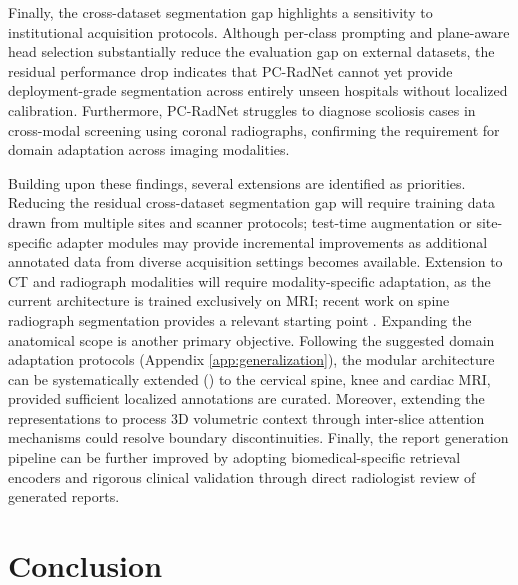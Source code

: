 \documentclass[journal]{IEEEtran}
\newcommand{\modelname}{PC-RadNet}
\begin{document}
Finally, the cross-dataset segmentation gap highlights a sensitivity to institutional acquisition protocols. Although per-class prompting and plane-aware head selection substantially reduce the evaluation gap on external datasets, the residual performance drop indicates that \modelname{} cannot yet provide deployment-grade segmentation across entirely unseen hospitals without localized calibration. Furthermore, \modelname{} struggles to diagnose scoliosis cases in cross-modal screening using coronal radiographs, confirming the requirement for domain adaptation across imaging modalities. 


Building upon these findings, several extensions are identified as priorities. Reducing the residual cross-dataset segmentation gap will require training data drawn from multiple sites and scanner protocols; test-time augmentation or site-specific adapter modules may provide incremental improvements as additional annotated data from diverse acquisition settings becomes available. Extension to CT and radiograph modalities will require modality-specific adaptation, as the current architecture is trained exclusively on MRI; recent work on spine radiograph segmentation provides a relevant starting point \cite{spinefm2025}. Expanding the anatomical scope is another primary objective. Following the suggested domain adaptation protocols (Appendix \ref{app:generalization}), the modular architecture can be systematically extended () to the cervical spine, knee and cardiac MRI, provided sufficient localized annotations are curated. Moreover, extending the representations to process 3D volumetric context through inter-slice attention mechanisms could resolve boundary discontinuities. Finally, the report generation pipeline can be further improved by adopting biomedical-specific retrieval encoders and rigorous clinical validation through direct radiologist review of generated reports. 

\section{Conclusion}
\label{sec:conclusion}
\end{document}
